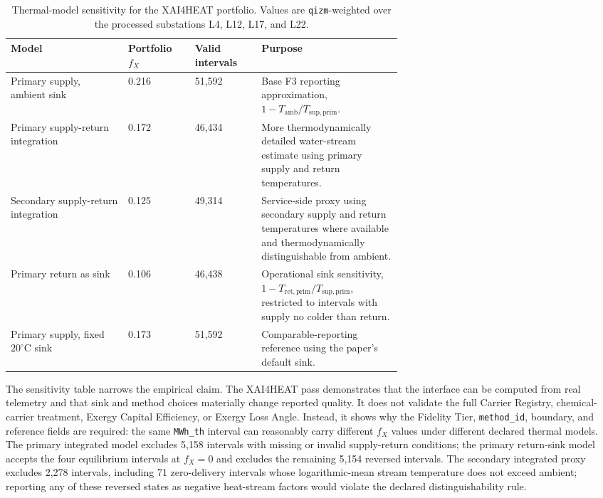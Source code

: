 \documentclass[11pt]{article}
\newcommand{\fx}{f_X}
\newcommand{\degC}{^{\circ}\mathrm{C}}
\begin{document}
\begin{table}[H]
\centering
\small
\caption{Thermal-model sensitivity for the XAI4HEAT portfolio. Values are \texttt{qizm}-weighted over the processed substations L4, L12, L17, and L22.}
\label{tab:xai4heat_sensitivity}
\begin{tabularx}{\linewidth}{@{}p{0.30\linewidth}p{0.17\linewidth}p{0.17\linewidth}X@{}}
\toprule
Model & Portfolio $\fx$ & Valid intervals & Purpose \\
\midrule
Primary supply, ambient sink & 0.216 & 51{,}592 & Base F3 reporting approximation, $1-T_{\mathrm{amb}}/T_{\mathrm{sup,prim}}$. \\
Primary supply-return integration & 0.172 & 46{,}434 & More thermodynamically detailed water-stream estimate using primary supply and return temperatures. \\
Secondary supply-return integration & 0.125 & 49{,}314 & Service-side proxy using secondary supply and return temperatures where available and thermodynamically distinguishable from ambient. \\
Primary return as sink & 0.106 & 46{,}438 & Operational sink sensitivity, $1-T_{\mathrm{ret,prim}}/T_{\mathrm{sup,prim}}$, restricted to intervals with supply no colder than return. \\
Primary supply, fixed $20\degC$ sink & 0.173 & 51{,}592 & Comparable-reporting reference using the paper's default sink. \\
\bottomrule
\end{tabularx}
\end{table}

The sensitivity table narrows the empirical claim. The XAI4HEAT pass demonstrates that the interface can be computed from real telemetry and that sink and method choices materially change reported quality. It does not validate the full Carrier Registry, chemical-carrier treatment, Exergy Capital Efficiency, or Exergy Loss Angle. Instead, it shows why the Fidelity Tier, \texttt{method\_id}, boundary, and reference fields are required: the same \texttt{MWh\_th} interval can reasonably carry different $\fx$ values under different declared thermal models. The primary integrated model excludes 5{,}158 intervals with missing or invalid supply-return conditions; the primary return-sink model accepts the four equilibrium intervals at $\fx=0$ and excludes the remaining 5{,}154 reversed intervals. The secondary integrated proxy excludes 2{,}278 intervals, including 71 zero-delivery intervals whose logarithmic-mean stream temperature does not exceed ambient; reporting any of these reversed states as negative heat-stream factors would violate the declared distinguishability rule.
\end{document}
